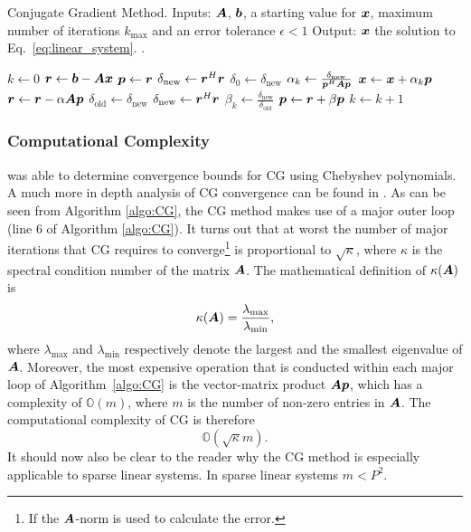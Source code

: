 \documentclass[useAMS,usenatbib]{mn2e}
\newcommand{\bA}{\bmath{A}}
\newcommand{\br}{\bmath{r}}
\newcommand{\bb}{\bmath{b}}
\newcommand{\bx}{\bmath{x}}
\newcommand{\bp}{\bmath{p}}
\begin{document}

\begin{algorithm}
\caption{Conjugate Gradient Method. Inputs: $\bA$, $\bb$, a starting value for $\bx$, maximum number of iterations $k_{\textrm{max}}$ and an error tolerance $\epsilon<1$ Output: $\bx$ the solution to Eq.~\eqref{eq:linear_system}. \citep{Shewchuk1994}.}\label{algo:CG}
\begin{algorithmic}[1]
\State $k \gets 0$
\State $\br \gets \bb - \bA\bx$
\State $\bp \gets \br$
\State $\delta_{\textrm{new}} \gets \br^H\br$
\State $\delta_0 \gets \delta_{\textrm{new}}$
\State $\alpha_k \gets \frac{\delta_{\textrm{new}}}{\bp^H\bA\bp}$
\State $\bx \gets \bx + \alpha_k\bp$
\State $\br \gets \br - \alpha\bA\bp$
\State $\delta_{\textrm{old}} \gets \delta_{\textrm{new}}$ 
\State $\delta_{\textrm{new}} \gets \br^H\br$
\State $\beta_{k} \gets \frac{\delta_{\textrm{new}}}{\delta_{\textrm{old}}}$
\State $\bp \gets \br + \beta\bp$
\State $k \gets k + 1$
\EndWhile
\end{algorithmic}
\end{algorithm}

\subsubsection{Computational Complexity}
\citet{Kaniel1966} was able to determine convergence bounds for CG using Chebyshev polynomials. A much more in depth analysis of CG convergence can be found in
\citep{Sluis1986}. As can be seen from Algorithm \ref{algo:CG}, the CG method makes use of a major outer loop (line 6 of Algorithm \ref{algo:CG}). It turns out that at worst 
the number of major iterations that CG requires to converge\footnote{If the $\bA$-norm is used to calculate the error.} is proportional to $\sqrt{\kappa}$, where $\kappa$ is the spectral condition number of the matrix $\bA$.
The mathematical definition of $\kappa(\bA)$ is
\begin{equation}
\label{eq:kappa}
\kappa(\bA) = \frac{\lambda_{\textrm{max}}}{\lambda_{\textrm{min}}}, 
\end{equation}
where $\lambda_{\textrm{max}}$ and $\lambda_{\textrm{min}}$ respectively denote the largest and the smallest eigenvalue of $\bA$.
Moreover, the most expensive operation that is conducted within each major loop of Algorithm~\ref{algo:CG} is the vector-matrix product $\bA\bp$, which has a complexity of $\mathbb{O}(m)$, where $m$ is the number of non-zero entries in $\bA$.
The computational complexity of CG is therefore 
\begin{equation}
\label{eq:cg_bound}
\mathbb{O}(\sqrt{\kappa}m). 
\end{equation}
It should now also be clear to the reader why the CG method is especially applicable to sparse linear systems. In sparse linear systems $m < P^2$.
\end{document}
